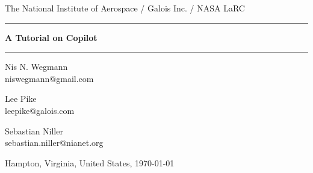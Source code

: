 \documentclass[a4paper, 10pt]{article}
\theoremstyle{example}
\newcommand{\HRule}{\rule{\linewidth}{0.25pt}}
\begin{document}
\thispagestyle{empty}

\begin{center}

The National Institute of Aerospace / Galois Inc. / NASA LaRC

\vspace{0.1cm}

\HRule

\vspace{0.6cm}

{\Huge \bfseries
A Tutorial on Copilot
}
\HRule

\vspace{0.6cm}

\begin{minipage}{0.3\textwidth}
\large
\begin{center}
Nis N. Wegmann\\
\small{
niswegmann@gmail.com\\
}
\end{center}
\end{minipage}
\begin{minipage}{0.3\textwidth}
\large
\begin{center}
Lee Pike\\
\small{
leepike@galois.com\\
}
\end{center}
\end{minipage}
\begin{minipage}{0.3\textwidth}
\large
\begin{center}
Sebastian Niller\\
\small{
sebastian.niller@nianet.org\\
}
\end{center}
\end{minipage}


\vspace{1cm}

{\large
Hampton, Virginia, United States, \today
}



\let\thefootnote\relax{}

\end{center}
\end{document}
